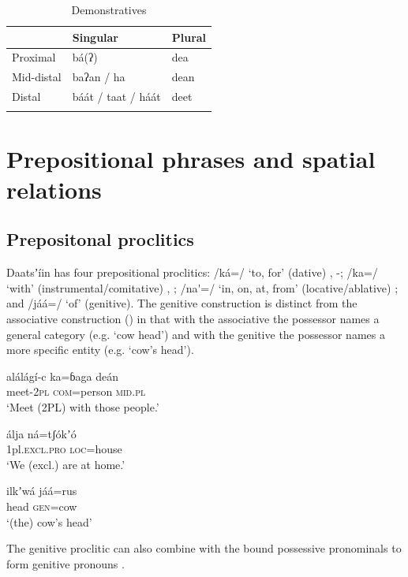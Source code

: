\documentclass[output=paper]{langsci/langscibook}
\begin{document}
\begin{table}
\begin{tabularx}{\textwidth}{XXX} 
\lsptoprule & Singular &  Plural\\
\midrule
 Proximal &  bá(ʔ) & dea\\
 Mid-distal & baʔan / ha &  dean\\
Distal & báát / taat / háát & deet\\
\lspbottomrule
\end{tabularx}
\caption{Demonstratives}
\label{tab:ahlandc:11}
\end{table}

\section{Prepositional phrases and spatial relations}\label{sec:ahlandc:10}

\subsection{Prepositonal proclitics}\label{sec:ahlandc:10.1}

Daatsʼíin has four prepositional proclitics: /ká=/ ‘to, for’ (dative) , -; /ka=/ ‘with’ (instrumental/comitative) , ; /na\'{ }=/ ‘in, on, at, from’ (locative/ablative) ; and /jáá=/ ‘of’ (genitive).  The genitive construction  is distinct from the associative construction () in that with the associative the possessor names a general category (e.g. ‘cow head’) and with the genitive the possessor names a more specific entity (e.g. ‘cow’s head’).

\ea\label{ex:ahlandc:56}
\gll
alálágí-c  ka=ɓaga  deán    \\
meet-\textsc{2pl}   \textsc{com}=person  \textsc{mid.pl} \\
\glt
‘Meet (2PL) with those people.’
\z

\ea\label{ex:ahlandc:57}
\gll
álja  ná=tʃ\'{o}kʼ\'{o} \\
1pl\textsc{.excl.pro}   \textsc{loc}=house \\
\glt
‘We (excl.) are at home.’
\z

\ea\label{ex:ahlandc:58}
\gll
ilkʼwá  jáá=rus \\
head   \textsc{gen}=cow \\
\glt
‘(the) cow’s head’
\z

The genitive proclitic can also combine with the bound possessive pronominals to form genitive pronouns .
\end{document}
